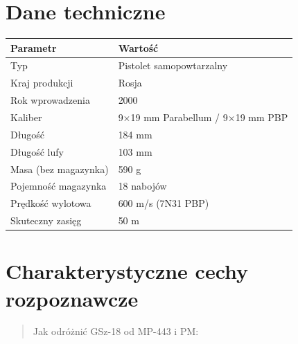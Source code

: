 \documentclass[12pt,openany,oneside]{book}
\begin{document}
\section{Dane techniczne}\label{dane-techniczne-92}

\begin{longtable}[]{@{}ll@{}}
\toprule\noalign{}
Parametr & Wartość \\
\midrule\noalign{}
\endhead
\bottomrule\noalign{}
\endlastfoot
Typ & Pistolet samopowtarzalny \\
Kraj produkcji & Rosja \\
Rok wprowadzenia & 2000 \\
Kaliber & 9×19 mm Parabellum / 9×19 mm PBP \\
Długość & 184 mm \\
Długość lufy & 103 mm \\
Masa (bez magazynka) & 590 g \\
Pojemność magazynka & 18 nabojów \\
Prędkość wylotowa & 600 m/s (7N31 PBP) \\
Skuteczny zasięg & 50 m \\
\end{longtable}

\section{Charakterystyczne cechy
rozpoznawcze}\label{charakterystyczne-cechy-rozpoznawcze-92}

\begin{quote}
Jak odróżnić GSz-18 od MP-443 i PM:
\end{quote}
\end{document}
